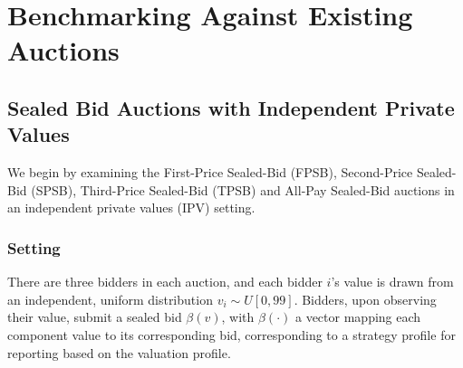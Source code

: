 \documentclass{article} %
\newcommand{\kibitz}[2]{\ifnum\Comments=1{\color{#1}{#2}}\fi}
\newcommand{\dcp}[1]{\kibitz{teal}{[DCP: #1]}}
\begin{document}


\section{Benchmarking Against Existing Auctions}\label{results}


\subsection{Sealed Bid Auctions with Independent Private Values}\label{section:classic}
We begin by examining the First-Price Sealed-Bid (FPSB), Second-Price Sealed-Bid (SPSB), Third-Price Sealed-Bid (TPSB) and All-Pay Sealed-Bid auctions in an independent private values (IPV) setting. 


\subsubsection{Setting}

There are three bidders in each auction, and each bidder $i$'s value is drawn from an independent, uniform distribution $v_i \sim U[0, 99]$. Bidders, upon observing their value, submit a sealed bid $\beta(v)$, with $\beta(\cdot)$ a vector mapping each component value to its corresponding bid, corresponding to a strategy profile for reporting based on the valuation profile. 
\end{document}
